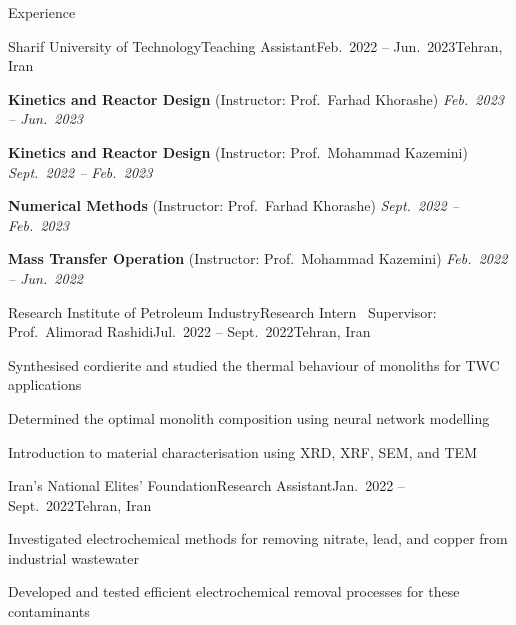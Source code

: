 \documentclass[]{kyvernitis-resume}
\begin{document}
\begin{section}{Experience}
    \begin{subsection}{Sharif University of Technology}{Teaching Assistant}{Feb.\ 2022 -- Jun.\ 2023}{Tehran, Iran}
        \item \textbf{Kinetics and Reactor Design} (Instructor: Prof.\ Farhad Khorashe) \hfill \textit{Feb.\ 2023 -- Jun.\ 2023}
        \item \textbf{Kinetics and Reactor Design} (Instructor: Prof.\ Mohammad Kazemini) \hfill \textit{Sept.\ 2022 -- Feb.\ 2023}
        \item \textbf{Numerical Methods} (Instructor: Prof.\ Farhad Khorashe) \hfill \textit{Sept.\ 2022 -- Feb.\ 2023}
        \item \textbf{Mass Transfer Operation} (Instructor: Prof.\ Mohammad Kazemini) \hfill \textit{Feb.\ 2022 -- Jun.\ 2022}
    \end{subsection}

    \begin{subsection}{Research Institute of Petroleum Industry}{Research Intern \textemdash\ Supervisor: Prof.\ Alimorad Rashidi}{Jul.\ 2022 -- Sept.\ 2022}{Tehran, Iran}
        \item Synthesised cordierite and studied the thermal behaviour of monoliths for TWC applications
        \item Determined the optimal monolith composition using neural network modelling
        \item Introduction to material characterisation using XRD, XRF, SEM, and TEM
    \end{subsection}

    \begin{subsection}{Iran's National Elites' Foundation}{Research Assistant}{Jan.\ 2022 -- Sept.\ 2022}{Tehran, Iran}
        \item Investigated electrochemical methods for removing nitrate, lead, and copper from industrial wastewater
        \item Developed and tested efficient electrochemical removal processes for these contaminants
    \end{subsection}
\end{section}
\end{document}
